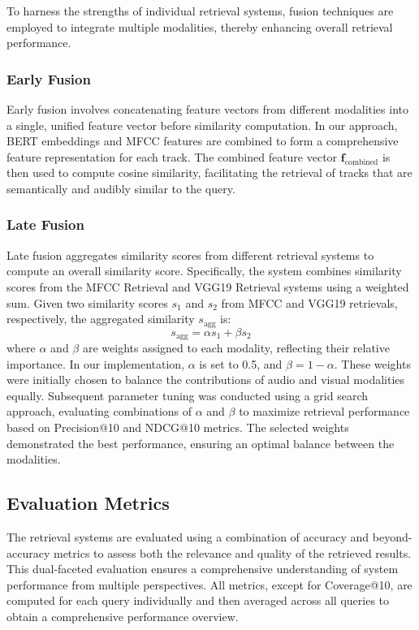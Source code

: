 \documentclass[sigconf]{acmart}
\begin{document}
To harness the strengths of individual retrieval systems, fusion techniques are employed to integrate multiple modalities, thereby enhancing overall retrieval performance.

\subsubsection{Early Fusion}

Early fusion involves concatenating feature vectors from different modalities into a single, unified feature vector before similarity computation. In our approach, BERT embeddings and MFCC features are combined to form a comprehensive feature representation for each track. The combined feature vector \( \mathbf{f}_{\text{combined}} \) is then used to compute cosine similarity, facilitating the retrieval of tracks that are semantically and audibly similar to the query.

\subsubsection{Late Fusion}

Late fusion aggregates similarity scores from different retrieval systems to compute an overall similarity score. Specifically, the system combines similarity scores from the MFCC Retrieval and VGG19 Retrieval systems using a weighted sum. Given two similarity scores \( s_1 \) and \( s_2 \) from MFCC and VGG19 retrievals, respectively, the aggregated similarity \( s_{\text{agg}} \) is:
\[
s_{\text{agg}} = \alpha s_1 + \beta s_2
\]
where \( \alpha \) and \( \beta \) are weights assigned to each modality, reflecting their relative importance. In our implementation, \( \alpha \) is set to 0.5, and \( \beta = 1 - \alpha \). These weights were initially chosen to balance the contributions of audio and visual modalities equally. Subsequent parameter tuning was conducted using a grid search approach, evaluating combinations of \( \alpha \) and \( \beta \) to maximize retrieval performance based on Precision@10 and NDCG@10 metrics. The selected weights demonstrated the best performance, ensuring an optimal balance between the modalities.


\subsection{Evaluation Metrics}
\label{subsec:evaluation_metrics}

The retrieval systems are evaluated using a combination of accuracy and beyond-accuracy metrics to assess both the relevance and quality of the retrieved results. This dual-faceted evaluation ensures a comprehensive understanding of system performance from multiple perspectives. All metrics, except for Coverage@10, are computed for each query individually and then averaged across all queries to obtain a comprehensive performance overview.
\end{document}
